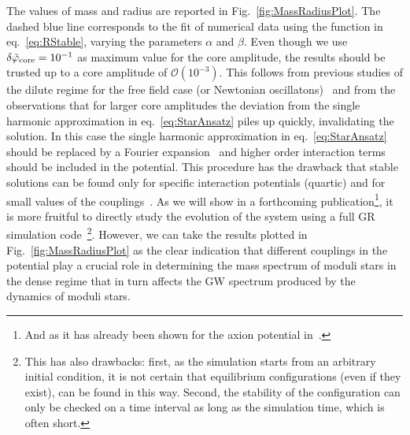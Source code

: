 \documentclass[11pt,a4paper]{article}
\begin{document}
The values of mass and radius are reported in Fig.~\ref{fig:MassRadiusPlot}. The dashed blue line corresponds to the fit of numerical data using the function in eq.~\eqref{eq:RStable}, varying the parameters $\alpha$ and $\beta$. Even though we use $\delta\tilde\varphi_{\rm core} = 10^{-1}$ as maximum value for the core amplitude, the results should be trusted up to a core amplitude of $\mathcal{O}\left(10^{-3}\right)$. This follows from previous studies of the dilute regime for the free field case (or Newtonian oscillatons)~\cite{UrenaLopez:2002gx} and from the observations that for larger core amplitudes the deviation from the single harmonic approximation in eq.~\eqref{eq:StarAnsatz} piles up quickly, invalidating the solution. In this case the single harmonic approximation in eq.~\eqref{eq:StarAnsatz} should be replaced by a Fourier expansion~\cite{UrenaLopez:2001tw, UrenaLopez:2002gx} and higher order interaction terms should be included in the potential. This procedure has the drawback that stable solutions can be found only for specific interaction potentials (quartic) and for small values of the couplings~\cite{UrenaLopez:2012zz}. As we will show in a forthcoming publication\footnote{And as it has already been shown for the axion potential in~\cite{Helfer:2016ljl}.}, it is more fruitful to directly study the evolution of the system using a full GR simulation code~\cite{Clough:2015sqa}\footnote{This has also drawbacks: first, as the simulation starts from an arbitrary initial condition, it is not certain that equilibrium configurations (even if they exist), can be found in this way. Second, the stability of the configuration can only be checked on a time interval as long as the simulation time, which is often short.}. However, we can take the results plotted in Fig.~\ref{fig:MassRadiusPlot} as the clear indication that different couplings in the potential play a crucial role in determining the mass spectrum of moduli stars in the dense regime that in turn affects the GW spectrum produced by the dynamics of moduli stars.\\
\end{document}
